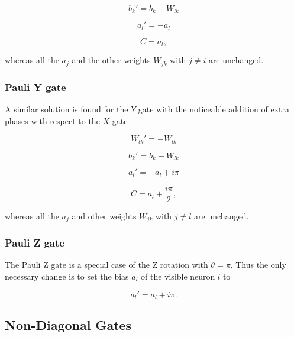 \begin{equation}
   b_{k}\prime = b_{k} + W_{lk}
\end{equation}

\begin{equation}
   a_{l}\prime = -a_{l}
\end{equation}

\begin{equation}
   C = a_{l},
\end{equation}

whereas all the $a_{j}$ and the other weights $W_{jk}$ with $j \neq i$ are unchanged.

\subsubsection{Pauli Y gate}
A similar solution is found for the $Y$ gate with the noticeable addition of extra phases
with respect to the $X$ gate

\begin{equation}
   W_{lk}\prime = -W_{lk}
\end{equation}

\begin{equation}
   b_{k}\prime = b_{k} + W_{lk}
\end{equation}

\begin{equation}
   a_{l}\prime = -a_{l} + i \pi
\end{equation}

\begin{equation}
   C = a_{l} + \frac{i \pi}{2},
\end{equation}

whereas all the $a_{j}$ and other weights $W_{jk}$ with $j \neq l$ are unchanged.

\subsubsection{Pauli Z gate}
The Pauli Z gate is a special case of the Z rotation with $\theta = \pi$. Thus the 
only necessary change is to set the bias $a_l$ of the visible neuron $l$ to

\begin{equation}
    a_{l}\prime = a_{l} + i \pi.
\end{equation}

\subsection{Non-Diagonal Gates}

